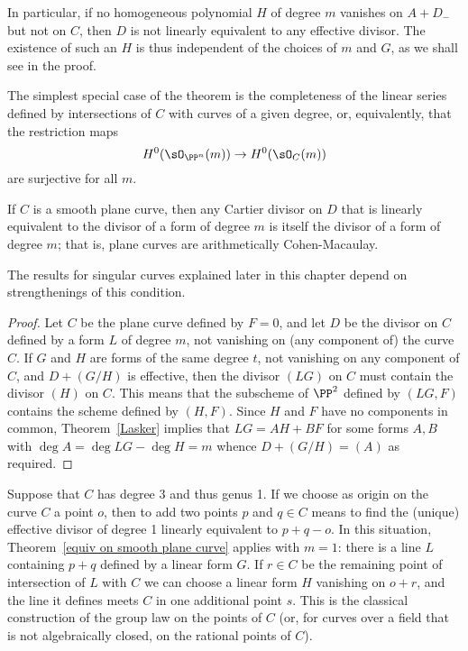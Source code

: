 In particular, if no homogeneous polynomial $H$ of degree $m$ vanishes on  $A + D_{-}$ but not on $C$, then $D$ is not linearly equivalent to any effective divisor. The existence of such an $H$ is thus independent of the choices of $m$ and $G$, as we shall see in the proof.

The simplest special case of the theorem is the completeness of the linear series defined
by intersections of $C$ with curves of a given degree, 
or, equivalently, that the restriction maps
$$
H^{0}(\sO_{\PP^{n}}(m)) \to H^{0}(\sO_{C}(m))
$$
are surjective for all $m$. 

\begin{proposition}\label {completeness of hyperplanes on plane curve}
If $C$ is a smooth plane curve, then any Cartier divisor on $D$ that is linearly equivalent to the divisor of
a form of degree $m$ is itself the divisor of a form of degree $m$; that is, plane curves are
arithmetically Cohen-Macaulay.
\end{proposition}

 The results for singular curves explained later in this chapter
 depend on strengthenings  of this condition.
 
\begin{proof}
Let $C$ be the plane curve defined by $F=0$, and let $D$ be the divisor on $C$ defined by a form $L$
of degree $m$, not vanishing on (any component of) the curve $C$. If $G$ and $H$ are forms of the same degree $t$, 
not vanishing on any component of $C$,
and $D+(G/H)$ is effective, then the divisor $(LG)$  on $C$ must contain the divisor $(H)$ on $C$.
This means that the subscheme of $\PP^{2}$ defined by $(LG,F)$ contains the scheme defined 
by $(H,F)$. Since $H$ and $F$ have no components in common, Theorem~\ref{Lasker} implies
that $LG = AH+BF$  for some forms $A,B$ with $\deg A = \deg LG -\deg H = m$ whence $D+(G/H) = (A)$
as required.
\end{proof}

\begin{example}
Suppose that $C$ has degree 3 and thus genus 1. If we choose as origin on the curve $C$ a point $o$, then to add two points $p$ and $q \in C$ means to find the (unique) effective divisor of degree 1 linearly equivalent to $p + q - o$. In this situation, Theorem~\ref{equiv on smooth plane curve} applies with $m=1$: there is a line $L$ 
containing $p+q$ defined by a linear form $G$. If $r \in C$ be the remaining point of intersection of $L$ with $C$ we can choose a linear form $H$ vanishing on $o+r$, and the line it defines meets $C$
in one additional point $s$. This is the classical construction of the group law on the points of $C$ (or,
for curves over a field that is not algebraically closed, on the rational points of $C$).
\end{example}

